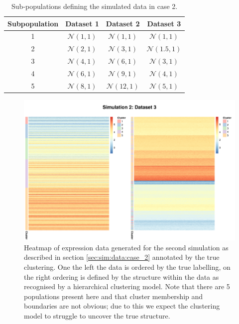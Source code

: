 \documentclass[12pt]{article} %
\begin{document}
\begin{table}[!htb] 
	\centering
	\begin{tabular}{c|ccc} 
		Subpopulation	& Dataset 1	& Dataset 2	& Dataset 3	\\ 
		\hline
		1 		& $\mathcal{N}(1,1)$	& $\mathcal{N}(1,1)$ 	& $\mathcal{N}(1,1)$	\\
		2 		& $\mathcal{N}(2,1)$	& $\mathcal{N}(3,1)$ 	& $\mathcal{N}(1.5,1)$	\\
		3 		& $\mathcal{N}(4,1)$	& $\mathcal{N}(6,1)$ 	& $\mathcal{N}(3,1)$	\\
		4 		& $\mathcal{N}(6,1)$	& $\mathcal{N}(9,1)$ 	& $\mathcal{N}(4,1)$	\\
		5 		& $\mathcal{N}(8,1)$	& $\mathcal{N}(12,1)$ 	& $\mathcal{N}(5,1)$	
	\end{tabular}
	\caption{Sub-populations defining the simulated data in case 2.}
	\label{table:generated_data_case_2}
\end{table}

	\begin{figure} %
		\centering
		\includegraphics[scale=0.7]{Images/Gen_data/Case_2/dataset_3_comp_clustered_unclustered.png}
		\caption{Heatmap of expression data generated for the second simulation as described in section \ref{sec:sim:data:case_2} annotated by the true clustering. One the left the data is ordered by the true labelling, on the right ordering is defined by the structure within the data as recognised by a hierarchical clustering model. Note that there are 5 populations present here and that cluster membership and boundaries are not obvious; due to this we expect the clustering model to struggle to uncover the true structure.}
		\label{fig:gen_data_3_sim_case_2}
	\end{figure}
\end{document}
